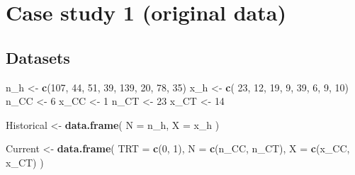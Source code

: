 \documentclass[
]{article}
\newenvironment{Shaded}{\begin{snugshade}}{\end{snugshade}}
\newcommand{\AttributeTok}[1]{\textcolor[rgb]{0.13,0.29,0.53}{#1}}
\newcommand{\DecValTok}[1]{\textcolor[rgb]{0.00,0.00,0.81}{#1}}
\newcommand{\FunctionTok}[1]{\textcolor[rgb]{0.13,0.29,0.53}{\textbf{#1}}}
\newcommand{\NormalTok}[1]{#1}
\newcommand{\OtherTok}[1]{\textcolor[rgb]{0.56,0.35,0.01}{#1}}
\begin{document}
\hypertarget{case-study-1-original-data}{%
\section{Case study 1 (original
data)}\label{case-study-1-original-data}}

\hypertarget{datasets}{%
\subsection{Datasets}\label{datasets}}

\begin{Shaded}
\begin{Highlighting}[]
\NormalTok{n\_h }\OtherTok{\textless{}{-}} \FunctionTok{c}\NormalTok{(}\DecValTok{107}\NormalTok{, }\DecValTok{44}\NormalTok{, }\DecValTok{51}\NormalTok{, }\DecValTok{39}\NormalTok{, }\DecValTok{139}\NormalTok{, }\DecValTok{20}\NormalTok{, }\DecValTok{78}\NormalTok{, }\DecValTok{35}\NormalTok{)}
\NormalTok{x\_h }\OtherTok{\textless{}{-}} \FunctionTok{c}\NormalTok{( }\DecValTok{23}\NormalTok{, }\DecValTok{12}\NormalTok{, }\DecValTok{19}\NormalTok{,  }\DecValTok{9}\NormalTok{,  }\DecValTok{39}\NormalTok{,  }\DecValTok{6}\NormalTok{,  }\DecValTok{9}\NormalTok{, }\DecValTok{10}\NormalTok{)}
\NormalTok{n\_CC }\OtherTok{\textless{}{-}} \DecValTok{6}
\NormalTok{x\_CC }\OtherTok{\textless{}{-}} \DecValTok{1}
\NormalTok{n\_CT }\OtherTok{\textless{}{-}} \DecValTok{23}
\NormalTok{x\_CT }\OtherTok{\textless{}{-}} \DecValTok{14}

\NormalTok{Historical }\OtherTok{\textless{}{-}} \FunctionTok{data.frame}\NormalTok{(}
  \AttributeTok{N =}\NormalTok{ n\_h, }
  \AttributeTok{X =}\NormalTok{ x\_h}
\NormalTok{)}

\NormalTok{Current }\OtherTok{\textless{}{-}} \FunctionTok{data.frame}\NormalTok{(}
  \AttributeTok{TRT =} \FunctionTok{c}\NormalTok{(}\DecValTok{0}\NormalTok{, }\DecValTok{1}\NormalTok{),}
  \AttributeTok{N =} \FunctionTok{c}\NormalTok{(n\_CC, n\_CT),}
  \AttributeTok{X =} \FunctionTok{c}\NormalTok{(x\_CC, x\_CT)}
\NormalTok{)}


\end{Highlighting}
\end{Shaded}
\end{document}
